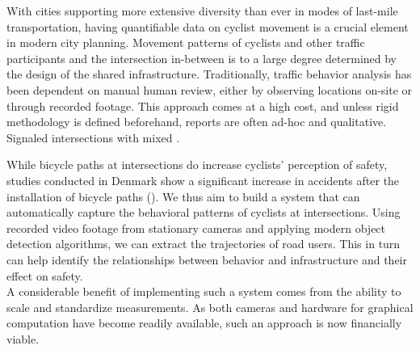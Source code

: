 With cities supporting more extensive diversity than ever in modes of last-mile transportation,
having quantifiable data on cyclist movement is a crucial element in modern city planning. 
Movement patterns of cyclists and other traffic participants and the intersection in-between 
is to a large degree determined by the design of the shared infrastructure. 
Traditionally, traffic behavior analysis has been dependent on manual human review, either by observing locations on-site or through recorded footage. 
This approach comes at a high cost, and unless rigid methodology is defined beforehand, reports are often ad-hoc and qualitative. 
\ \\

\color{red}
Signaled intersections with mixed .
\color{black}

While bicycle paths at intersections do increase cyclists' perception of safety, 
studies conducted in Denmark show a significant increase in accidents after the installation of bicycle paths (\cite{intersection_safety}).
We thus aim to build a system that can automatically capture the behavioral patterns of cyclists at intersections.
Using recorded video footage from stationary cameras and applying modern object detection algorithms, 
we can extract the trajectories of road users. 
This in turn can help identify the relationships between behavior and infrastructure and their effect on safety. 
\ \\

A considerable benefit of implementing such a system comes from the ability to scale and standardize measurements.
As both cameras and hardware for graphical computation have become readily available, such an approach is now financially viable.